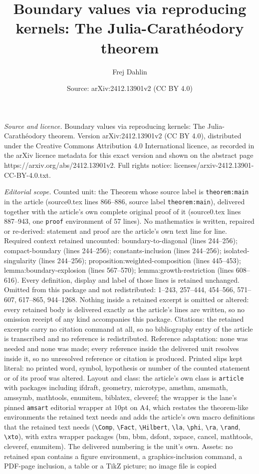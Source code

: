 \documentclass[10pt,a4paper]{amsart}
\title[Boundary values via reproducing kernels: The Julia-Carath\'e]{Boundary values via reproducing kernels: The Julia-Carath\'eodory theorem}
\author{Frej Dahlin}
\date{Source: arXiv:2412.13901v2 (CC BY 4.0)}
\begin{document}
\maketitle

\noindent\emph{Source and licence.} Boundary values via reproducing kernels: The Julia-Carath\'eodory theorem. Version arXiv:2412.13901v2 (CC BY 4.0), distributed under the Creative Commons Attribution 4.0 International licence, as recorded in the arXiv licence metadata for this exact version and shown on the abstract page https://arxiv.org/abs/2412.13901v2. Full rights notice: licenses/arxiv-2412.13901-CC-BY-4.0.txt.\par\smallskip

\noindent\textit{Editorial scope.} Counted unit: the Theorem whose source label is \texttt{theorem:main} in the article (source0.tex lines 866--886, source label \texttt{theorem:main}), delivered together with the article's own complete original proof of it (source0.tex lines 887--943, one \texttt{proof} environment of 57 lines). No mathematics is written, repaired or re-derived: statement and proof are the article's own text line for line. Required context retained uncounted: boundary-to-diagonal (lines 244--256); compact-boundary (lines 244--256); constants-inclusion (lines 244--256); isolated-singularity (lines 244--256); proposition:weighted-composition (lines 445--453); lemma:boundary-explosion (lines 567--570); lemma:growth-restriction (lines 608--616). Every definition, display and label of those lines is retained unchanged. Omitted from this package and not redistributed: 1--243, 257--444, 454--566, 571--607, 617--865, 944--1268. Nothing inside a retained excerpt is omitted or altered: every retained body is delivered exactly as the article's lines are written, so no omission receipt of any kind accompanies this package. Citations: the retained excerpts carry no citation command at all, so no bibliography entry of the article is transcribed and no reference is redistributed. Reference adaptation: none was needed and none was made; every reference inside the delivered unit resolves inside it, so no unresolved reference or citation is produced. Printed slips kept literal: no printed word, symbol, hypothesis or number of the counted statement or of its proof was altered. Layout and class: the article's own class is \texttt{article} with packages including ifdraft, geometry, microtype, amsthm, amsmath, amssymb, mathtools, enumitem, biblatex, cleveref; the wrapper is the lane's pinned \texttt{amsart} editorial wrapper at 10pt on A4, which restates the theorem-like environments the retained text needs and adds the article's own macro definitions that the retained text needs (\texttt{\textbackslash Comp}, \texttt{\textbackslash Fact}, \texttt{\textbackslash Hilbert}, \texttt{\textbackslash la}, \texttt{\textbackslash phi}, \texttt{\textbackslash ra}, \texttt{\textbackslash rand}, \texttt{\textbackslash xto}), with extra wrapper packages (bm, bbm, dsfont, xspace, cancel, mathtools, cleveref, enumitem). The delivered numbering is the unit's own. Assets: no retained span contains a figure environment, a graphics-inclusion command, a PDF-page inclusion, a table or a TikZ picture; no image file is copied 
\end{document}
